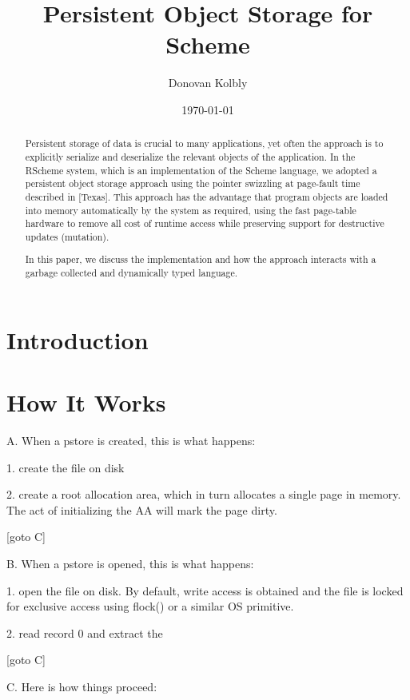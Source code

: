 \documentclass[10pt,letterpaper]{article}
\begin{document}
\title{Persistent Object Storage for Scheme}
\author{Donovan Kolbly}
\date{\today}
\maketitle

\begin{abstract}

Persistent storage of data is crucial to many applications, yet often
the approach is to explicitly serialize and deserialize the relevant
objects of the application.  In the RScheme system, which is an
implementation of the Scheme language, we adopted a persistent object
storage approach using the pointer swizzling at page-fault time
described in [Texas].  This approach has the advantage that program
objects are loaded into memory automatically by the system as required,
using the fast page-table hardware to remove all cost of runtime access
while preserving support for destructive updates (mutation).

In this paper, we discuss the implementation and how the approach
interacts with a garbage collected and dynamically typed language.

\end{abstract}

\section{Introduction}

\section{How It Works}

A. When a pstore is created, this is what happens:

1. create the file on disk

2. create a root allocation area, which in turn allocates a single
   page in memory.  The act of initializing the AA will mark the
   page dirty.

[goto C]

B. When a pstore is opened, this is what happens:

1. open the file on disk.  By default, write access is obtained and
   the file is locked for exclusive access using flock() or a similar
   OS primitive.

2. read record 0 and extract the

[goto C]

C. Here is how things proceed:
\end{document}
